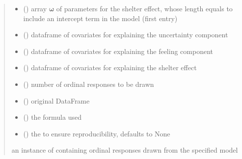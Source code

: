 \documentclass[letterpaper,10pt,english]{sphinxmanual}
\begin{document}
\begin{fulllineitems}
\begin{quote}
\begin{description}
\begin{itemize}
\item {} 
\sphinxAtStartPar
{} () \textendash{} array \(\pmb \omega\) of parameters for the shelter effect, whose length equals 
 to include an intercept term in the model (first entry)

\item {} 
\sphinxAtStartPar
{} () \textendash{} dataframe of covariates for explaining the uncertainty component

\item {} 
\sphinxAtStartPar
{} () \textendash{} dataframe of covariates for explaining the feeling component

\item {} 
\sphinxAtStartPar
{} () \textendash{} dataframe of covariates for explaining the shelter effect

\item {} 
\sphinxAtStartPar
{} () \textendash{} number of ordinal responses to be drawn

\item {} 
\sphinxAtStartPar
{} () \textendash{} original DataFrame

\item {} 
\sphinxAtStartPar
{} () \textendash{} the formula used

\item {} 
\sphinxAtStartPar
{} (\sphinxstyleliteralemphasis{\sphinxupquote{, }}) \textendash{} the  to ensure reproducibility, defaults to None

\end{itemize}

\sphinxAtStartPar
an instance of  containing ordinal responses drawn from the specified model

\end{description}\end{quote}

\end{fulllineitems}
\end{document}
